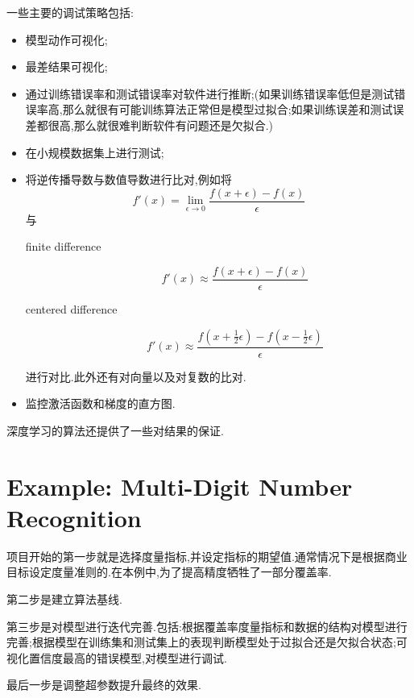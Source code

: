 一些主要的调试策略包括:
\begin{itemize}
    \item 模型动作可视化;
    \item 最差结果可视化;
    \item 通过训练错误率和测试错误率对软件进行推断;(如果训练错误率低但是测试错误率高,那么就很有可能训练算法正常但是模型过拟合;如果训练误差和测试误差都很高,那么就很难判断软件有问题还是欠拟合.)
    \item 在小规模数据集上进行测试;
    \item 将逆传播导数与数值导数进行比对,例如将
    \begin{equation}
    f'(x)=\lim_{\epsilon\to 0}\frac{f(x+\epsilon)-f(x)}{\epsilon}
    \end{equation}
    与
    \begin{description}
        \item [finite difference] \begin{equation}f'(x)\approx\frac{f(x+\epsilon)-f(x)}{\epsilon}\end{equation}
        \item [centered difference] \begin{equation}f'(x)\approx\frac{f(x+\frac{1}{2}\epsilon)-f(x-\frac{1}{2}\epsilon)}{\epsilon}\end{equation}
    \end{description}
    进行对比.此外还有对向量以及对复数的比对.
    \item 监控激活函数和梯度的直方图.
\end{itemize}

深度学习的算法还提供了一些对结果的保证.

\section{Example: Multi-Digit Number Recognition}

项目开始的第一步就是选择度量指标,并设定指标的期望值.通常情况下是根据商业目标设定度量准则的.在本例中,为了提高精度牺牲了一部分覆盖率.

第二步是建立算法基线.

第三步是对模型进行迭代完善.包括:根据覆盖率度量指标和数据的结构对模型进行完善;根据模型在训练集和测试集上的表现判断模型处于过拟合还是欠拟合状态;可视化置信度最高的错误模型,对模型进行调试.

最后一步是调整超参数提升最终的效果.